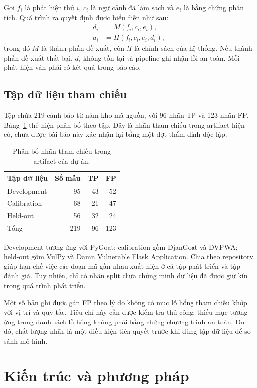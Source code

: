 \documentclass[11pt,a4paper]{article}
\begin{document}
Gọi $f_i$ là phát hiện thứ $i$, $c_i$ là ngữ cảnh đã làm sạch và $e_i$ là bằng chứng phân tích. Quá trình ra quyết định được biểu diễn như sau:
\begin{align}
 d_i &= M(f_i,c_i,e_i),\\
 a_i &= \Pi(f_i,c_i,e_i,d_i),
\end{align}
trong đó $M$ là thành phần đề xuất, còn $\Pi$ là chính sách của hệ thống. Nếu thành phần đề xuất thất bại, $d_i$ không tồn tại và pipeline ghi nhận lỗi an toàn. Mỗi phát hiện vẫn phải có kết quả trong báo cáo.

\subsection{Tập dữ liệu tham chiếu}
Tệp  chứa 219 cảnh báo từ năm kho mã nguồn, với 96 nhãn TP và 123 nhãn FP. Bảng~\ref{tab:data} thể hiện phân bố theo tập. Đây là nhãn tham chiếu trong artifact hiện có, chưa được bài báo này xác nhận lại bằng một đợt thẩm định độc lập.

\begin{table}[t]
\centering\small
\begin{tabular}{@{}lrrr@{}}
\toprule
Tập dữ liệu & Số mẫu & TP & FP\\
\midrule
Development & 95 & 43 & 52\\
Calibration & 68 & 21 & 47\\
Held-out & 56 & 32 & 24\\
\midrule
Tổng & 219 & 96 & 123\\
\bottomrule
\end{tabular}
\caption{Phân bố nhãn tham chiếu trong artifact của dự án.}
\label{tab:data}
\end{table}

Development tương ứng với PyGoat; calibration gồm DjanGoat và DVPWA; held-out gồm VulPy và Damn Vulnerable Flask Application. Chia theo repository giúp hạn chế việc các đoạn mã gần nhau xuất hiện ở cả tập phát triển và tập đánh giá. Tuy nhiên, chỉ có nhãn split chưa chứng minh dữ liệu đã được giữ kín trong quá trình phát triển.

Một số bản ghi được gán FP theo lý do không có mục lỗ hổng tham chiếu khớp với vị trí và quy tắc. Tiêu chí này cần được kiểm tra thủ công: thiếu mục tương ứng trong danh sách lỗ hổng không phải bằng chứng chương trình an toàn. Do đó, chất lượng nhãn là một điều kiện tiên quyết trước khi dùng tập dữ liệu để so sánh mô hình.

\section{Kiến trúc và phương pháp}
\end{document}
